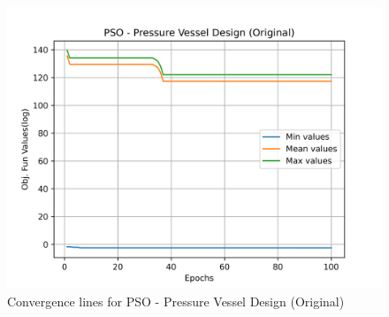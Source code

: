 \begin{figure}[H]
        \centering
        \caption{Convergence lines for PSO - Pressure Vessel Design (Original)}
        \label{fig:pressure_vessel_problem_original_solve_pso}
        \includegraphics[scale=0.5]{images/pressure_vessel_problem_original_solve_pso.png}
        \end{figure}
        
